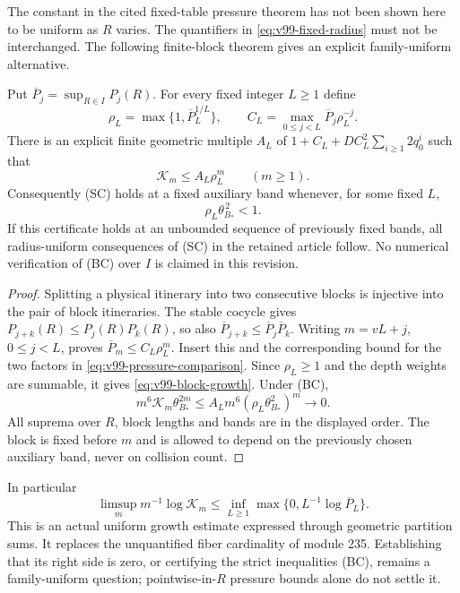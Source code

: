 The constant in the cited fixed-table pressure theorem has not been
shown here to be uniform as $R$ varies. The quantifiers in
\eqref{eq:v99-fixed-radius} must not be interchanged. The following
finite-block theorem gives an explicit family-uniform alternative.

\begin{theorem}
\label{thm:v99-block}
Put $\overline P_j=\sup_{R\in I}P_j(R)$. For every fixed integer
$L\ge1$ define
\[
 \rho_L=\max\{1,\overline P_L^{1/L}\},\qquad
 C_L=\max_{0\le j<L}\overline P_j\rho_L^{-j}.
\]
There is an explicit finite geometric multiple $A_L$ of
$1+C_L+DC_L^2\sum_{i\ge1}2q_0^i$ such that
\begin{equation}\label{eq:v99-block-growth}
                 \mathcal K_m\le A_L\rho_L^m\qquad(m\ge1).
\end{equation}
Consequently (SC) holds at a fixed auxiliary band whenever, for some
fixed $L$,
\begin{equation}\label{eq:v99-block-certificate}
                 \rho_L\theta_{B_*}^{\,2}<1.\tag{BC}
\end{equation}
If this certificate holds at an unbounded sequence of previously
fixed bands, all radius-uniform consequences of (SC) in the retained
article follow. No numerical verification of (BC) over $I$ is
claimed in this revision.
\end{theorem}
\begin{proof}
Splitting a physical itinerary into two consecutive blocks is
injective into the pair of block itineraries. The stable cocycle
gives $P_{j+k}(R)\le P_j(R)P_k(R)$, so also
$\overline P_{j+k}\le\overline P_j\overline P_k$.
Writing $m=vL+j$, $0\le j<L$, proves
$\overline P_m\le C_L\rho_L^m$. Insert this and the corresponding
bound for the two factors in \eqref{eq:v99-pressure-comparison}.
Since $\rho_L\ge1$ and the depth weights are summable, it gives
\eqref{eq:v99-block-growth}. Under (BC),
\[
 m^6\mathcal K_m\theta_{B_*}^{2m}
       \le A_Lm^6(\rho_L\theta_{B_*}^2)^m\longrightarrow0.
\]
All suprema over $R$, block lengths and bands are in the displayed
order. The block is fixed before $m$ and is allowed to depend on the
previously chosen auxiliary band, never on collision count.
\end{proof}

In particular
\[
 \limsup_m m^{-1}\log\mathcal K_m
       \le\inf_{L\ge1}\max\{0,L^{-1}\log\overline P_L\}.
\]
This is an actual uniform growth estimate expressed through geometric
partition sums. It replaces the unquantified fiber cardinality of
module 235. Establishing that its right side is zero, or certifying
the strict inequalities (BC), remains a family-uniform question;
pointwise-in-$R$ pressure bounds alone do not settle it.
